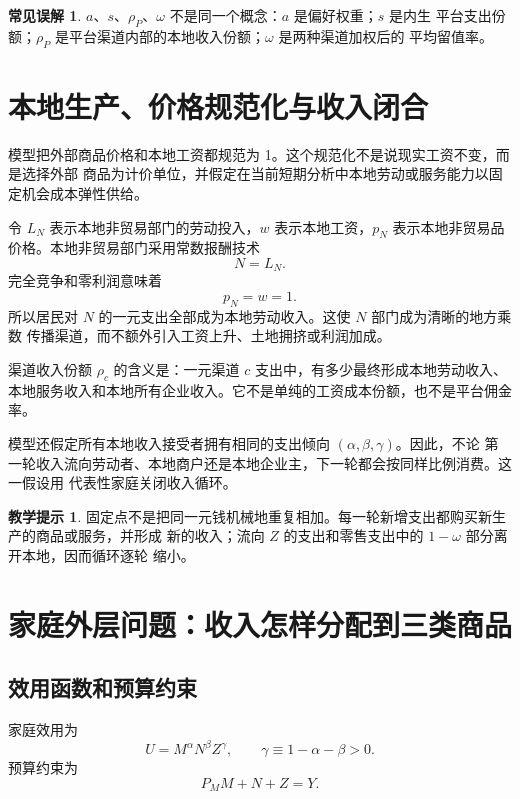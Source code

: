 \documentclass[UTF8,11pt,scheme=chinese,fontset=fandol]{ctexart}
\theoremstyle{definition}
\newtheorem{teachingpoint}{教学提示}[section]
\newtheorem{commonerror}{常见误解}[section]
\begin{document}
\begin{commonerror}
\(a\)、\(s\)、\(\rho_P\)、\(\omega\) 不是同一个概念：\(a\) 是偏好权重；\(s\) 是内生
平台支出份额；\(\rho_P\) 是平台渠道内部的本地收入份额；\(\omega\) 是两种渠道加权后的
平均留值率。
\end{commonerror}

\section{本地生产、价格规范化与收入闭合}

模型把外部商品价格和本地工资都规范为 1。这个规范化不是说现实工资不变，而是选择外部
商品为计价单位，并假定在当前短期分析中本地劳动或服务能力以固定机会成本弹性供给。

令 \(L_N\) 表示本地非贸易部门的劳动投入，\(w\) 表示本地工资，\(p_N\) 表示本地非贸易品
价格。本地非贸易部门采用常数报酬技术
\[
N=L_N.
\]
完全竞争和零利润意味着
\[
p_N=w=1.
\]
所以居民对 \(N\) 的一元支出全部成为本地劳动收入。这使 \(N\) 部门成为清晰的地方乘数
传播渠道，而不额外引入工资上升、土地拥挤或利润加成。

渠道收入份额 \(\rho_c\) 的含义是：一元渠道 \(c\) 支出中，有多少最终形成本地劳动收入、
本地服务收入和本地所有企业收入。它不是单纯的工资成本份额，也不是平台佣金率。

模型还假定所有本地收入接受者拥有相同的支出倾向 \((\alpha,\beta,\gamma)\)。因此，不论
第一轮收入流向劳动者、本地商户还是本地企业主，下一轮都会按同样比例消费。这一假设用
代表性家庭关闭收入循环。

\begin{teachingpoint}
固定点不是把同一元钱机械地重复相加。每一轮新增支出都购买新生产的商品或服务，并形成
新的收入；流向 \(Z\) 的支出和零售支出中的 \(1-\omega\) 部分离开本地，因而循环逐轮
缩小。
\end{teachingpoint}

\section{家庭外层问题：收入怎样分配到三类商品}

\subsection{效用函数和预算约束}

家庭效用为
\begin{equation}
U=M^\alpha N^\beta Z^\gamma,
\qquad \gamma\equiv1-\alpha-\beta>0.
\label{teach:eq:utility}
\end{equation}
预算约束为
\begin{equation}
P_MM+N+Z=Y.
\label{teach:eq:budget}
\end{equation}
\end{document}

